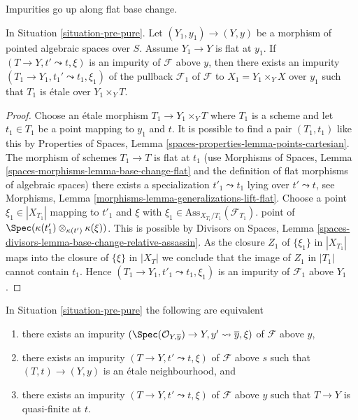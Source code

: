 \noindent
Impurities go up along flat base change.

\begin{lemma}
\label{lemma-flat-ascent-impurity}
In Situation \ref{situation-pre-pure}.
Let $(Y_1, y_1) \to (Y, y)$ be a morphism of pointed
algebraic spaces over $S$. Assume $Y_1 \to Y$ is flat at $y_1$.
If $(T \to Y, t' \leadsto t, \xi)$ is an impurity of
$\mathcal{F}$ above $y$, then there exists an impurity
$(T_1 \to Y_1, t_1' \leadsto t_1, \xi_1)$ of the pullback
$\mathcal{F}_1$ of $\mathcal{F}$ to $X_1 = Y_1 \times_Y X$
over $y_1$ such that $T_1$ is \'etale over $Y_1 \times_Y T$.
\end{lemma}

\begin{proof}
Choose an \'etale morphism $T_1 \to Y_1 \times_Y T$ where $T_1$
is a scheme and let $t_1 \in T_1$ be a point mapping to $y_1$ and $t$.
It is possible to find a pair $(T_1, t_1)$ like this by
Properties of Spaces, Lemma \ref{spaces-properties-lemma-points-cartesian}.
The morphism of schemes $T_1 \to T$ is flat at $t_1$
(use Morphisms of Spaces, Lemma \ref{spaces-morphisms-lemma-base-change-flat}
and the definition of flat morphisms of algebraic spaces)
there exists a specialization $t'_1 \leadsto t_1$ lying over
$t' \leadsto t$, see
Morphisms, Lemma \ref{morphisms-lemma-generalizations-lift-flat}.
Choose a point $\xi_1 \in |X_{T_1}|$ mapping to $t'_1$
and $\xi$ with $\xi_1 \in \text{Ass}_{X_{T_1}/T_1}(\mathcal{F}_{T_1})$.
point of $\Spec(\kappa(t'_1) \otimes_{\kappa(t')} \kappa(\xi))$.
This is possible by
Divisors on Spaces, Lemma
\ref{spaces-divisors-lemma-base-change-relative-assassin}.
As the closure $Z_1$ of $\{\xi_1\}$ in $|X_{T_1}|$ maps into the
closure of $\{\xi\}$ in $|X_T|$ we conclude that
the image of $Z_1$ in $|T_1|$ cannot contain $t_1$.
Hence $(T_1 \to Y_1, t'_1 \leadsto t_1, \xi_1)$
is an impurity of $\mathcal{F}_1$ above $Y_1$.
\end{proof}

\begin{lemma}
\label{lemma-pure-along-X-y}
In Situation \ref{situation-pre-pure} the following are equivalent
\begin{enumerate}
\item there exists an impurity
$(\Spec(\mathcal{O}_{Y, \overline{y}}) \to Y, y' \leadsto \overline{y}, \xi)$
of $\mathcal{F}$ above $y$,
\item there exists an impurity $(T \to Y, t' \leadsto t, \xi)$
of $\mathcal{F}$ above $s$ such that $(T, t) \to (Y, y)$ is an
\'etale neighbourhood, and
\item there exists an impurity $(T \to Y, t' \leadsto t, \xi)$
of $\mathcal{F}$ above $y$ such that $T \to Y$ is quasi-finite at $t$.
\end{enumerate}
\end{lemma}


